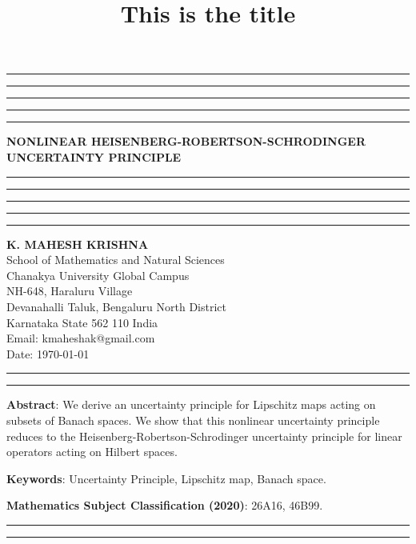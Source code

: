 \documentclass{amsart}
\title{This is the title}
\begin{document}
\hrule\hrule\hrule\hrule\hrule
\vspace{0.3cm}	
\begin{center}
{\bf{NONLINEAR HEISENBERG-ROBERTSON-SCHRODINGER   UNCERTAINTY PRINCIPLE}}\\
\vspace{0.3cm}
\hrule\hrule\hrule\hrule\hrule
\vspace{0.3cm}
\textbf{K. MAHESH KRISHNA}\\
School of Mathematics and Natural Sciences\\
Chanakya University Global Campus\\
NH-648, Haraluru Village\\
Devanahalli Taluk, 	Bengaluru  North District\\
Karnataka State 562 110 India\\
Email: kmaheshak@gmail.com\\

Date: \today
\end{center}

\hrule\hrule
\vspace{0.5cm}
\textbf{Abstract}:  We derive an uncertainty principle for Lipschitz maps acting on subsets of Banach spaces. We show that this nonlinear uncertainty principle reduces to the Heisenberg-Robertson-Schrodinger uncertainty principle for linear operators acting on Hilbert spaces.


\textbf{Keywords}:   Uncertainty Principle, Lipschitz map, Banach space.

\textbf{Mathematics Subject Classification (2020)}: 26A16, 46B99.\\

\hrule


\hrule
\end{document}
